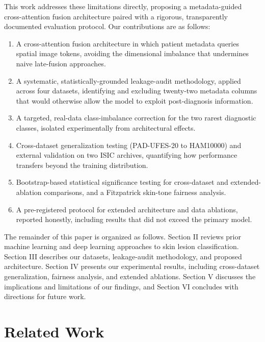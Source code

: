 \documentclass[conference]{IEEEtran}
\begin{document}
This work addresses these limitations directly, proposing a metadata-guided cross-attention fusion architecture paired with a rigorous, transparently documented evaluation protocol. Our contributions are as follows:

\begin{enumerate}
\item A cross-attention fusion architecture in which patient metadata queries spatial image tokens, avoiding the dimensional imbalance that undermines naive late-fusion approaches.
\item A systematic, statistically-grounded leakage-audit methodology, applied across four datasets, identifying and excluding twenty-two metadata columns that would otherwise allow the model to exploit post-diagnosis information.
\item A targeted, real-data class-imbalance correction for the two rarest diagnostic classes, isolated experimentally from architectural effects.
\item Cross-dataset generalization testing (PAD-UFES-20 to HAM10000) and external validation on two ISIC archives, quantifying how performance transfers beyond the training distribution.
\item Bootstrap-based statistical significance testing for cross-dataset and extended-ablation comparisons, and a Fitzpatrick skin-tone fairness analysis.
\item A pre-registered protocol for extended architecture and data ablations, reported honestly, including results that did not exceed the primary model.
\end{enumerate}

The remainder of this paper is organized as follows. Section II reviews prior machine learning and deep learning approaches to skin lesion classification. Section III describes our datasets, leakage-audit methodology, and proposed architecture. Section IV presents our experimental results, including cross-dataset generalization, fairness analysis, and extended ablations. Section V discusses the implications and limitations of our findings, and Section VI concludes with directions for future work.

\section{Related Work}
\end{document}

